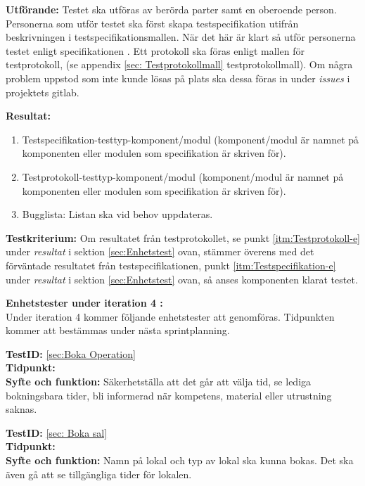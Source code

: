 \documentclass[a4paper,10pt, twoside]{article}
\begin{document}
\textbf{Utförande:} Testet ska utföras av berörda parter samt en oberoende person. Personerna som utför testet ska först skapa testspecifikation utifrån beskrivningen i testspecifikationsmallen. När det här är klart så utför personerna testet enligt specifikationen \cite{kravspec}. Ett protokoll ska föras enligt mallen för testprotokoll, (se appendix \ref{sec: Testprotokollmall} testprotokollmall). Om några problem uppstod som inte kunde lösas på plats ska dessa föras in under \emph{issues} i projektets gitlab.

\textbf{Resultat:}
	\begin{enumerate}
    	\item \label{itm:Testspecifikation-e} Testspecifikation-testtyp-komponent/modul (komponent/modul är namnet på 					  komponenten eller modulen som specifikation är skriven för).
      	\item \label{itm:Testprotokoll-e} Testprotokoll-testtyp-komponent/modul (komponent/modul är namnet på komponenten 				  eller modulen som specifikation är skriven för).
      	\item Bugglista: Listan ska vid behov uppdateras.
    \end{enumerate}

\textbf{Testkriterium:} Om resultatet från testprotokollet, se punkt \ref{itm:Testprotokoll-e} under \emph{resultat} i 	   sektion \ref{sec:Enhetstest} ovan, stämmer överens med det förväntade resultatet från testspecifikationen, punkt \ref{itm:Testspecifikation-e} under \emph{resultat} i sektion \ref{sec:Enhetstest} ovan, så anses komponenten klarat testet.

\textbf{Enhetstester under iteration 4 :} 
\\  Under iteration 4 kommer följande enhetstester att genomföras. Tidpunkten kommer att bestämmas under nästa sprintplanning.

\textbf{TestID:} \ref{sec:Boka Operation} 
\\ \textbf{Tidpunkt:}
\\ \textbf{Syfte och funktion:} Säkerhetställa att det går att välja tid, se lediga bokningsbara tider, bli informerad när kompetens, material eller utrustning saknas.
  
\textbf{TestID:} \ref{sec: Boka sal} 
\\ \textbf{Tidpunkt:}
\\ \textbf{Syfte och funktion:} Namn på lokal och typ av lokal ska kunna bokas. Det ska även gå att se tillgängliga tider för lokalen.
\end{document}
